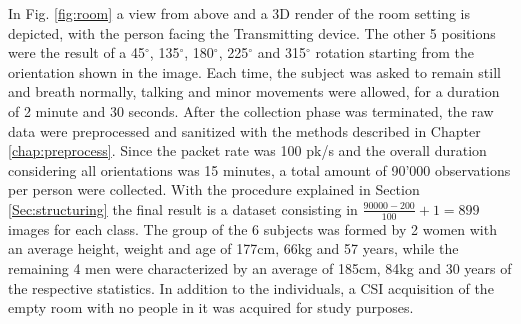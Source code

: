 \documentclass[binding=0.7cm, oneside]{sapthesis}
\begin{document}
In Fig. \ref{fig:room} a view from above and a 3D render of the room setting is depicted, with the person facing the Transmitting device. The other 5 positions were the result of a 45$^\circ$, 135$^\circ$, 180$^\circ$, 225$^\circ$ and 315$^\circ$ rotation starting from the orientation shown in the image.
Each time, the subject was asked to remain still and breath normally, talking and minor movements were allowed, for a duration of 2 minute and 30 seconds. After the collection phase was terminated, the raw data were preprocessed and sanitized with the methods described in Chapter \ref{chap:preprocess}.
Since the packet rate was 100 pk/s and the overall duration considering all orientations was 15 minutes, a total amount of 90'000 observations per person were collected.
With the procedure explained in Section \ref{Sec:structuring} the final result is a dataset consisting in $\frac{90000 - 200}{100} + 1 = 899$ images for each class. The group of the 6 subjects was formed by 2 women with an average height, weight and age of 177cm, 66kg and 57 years, while the remaining 4 men were characterized by an average of
185cm, 84kg and 30 years of the respective statistics. In addition to the individuals, a CSI acquisition of the empty room with no people in it was acquired for study purposes.
\end{document}
